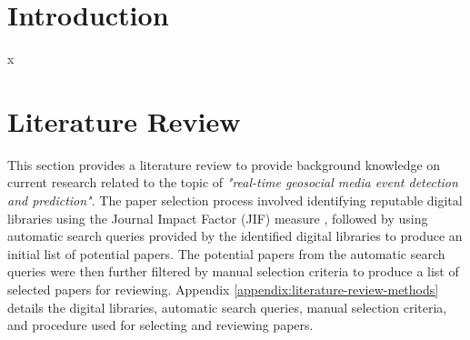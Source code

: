 



\section{Introduction} \label{introduction}

x




\section{Literature Review} \label{literature-review}

This section provides a literature review to provide background knowledge on current research related to the topic of \textit{"real-time geosocial media event detection and prediction"}. The paper selection process involved identifying reputable digital libraries using the Journal Impact Factor (JIF) measure \cite{Garfield:2006b}, followed by using automatic search queries provided by the identified digital libraries to produce an initial list of potential papers. The potential papers from the automatic search queries were then further filtered by manual selection criteria to produce a list of selected papers for reviewing. Appendix \ref{appendix:literature-review-methods} details the digital libraries, automatic search queries, manual selection criteria, and procedure used for selecting and reviewing papers.
